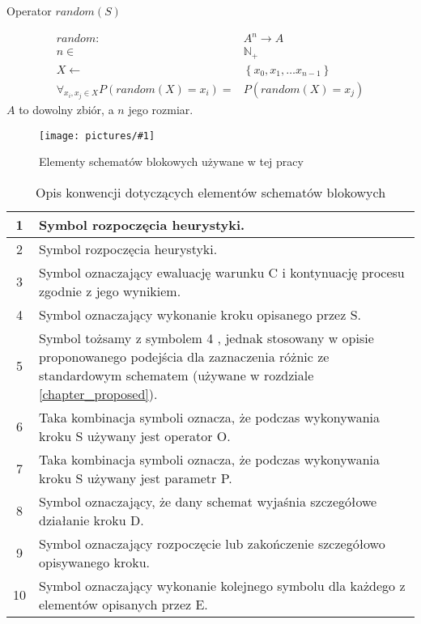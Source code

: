 \documentclass[twoside]{iisthesis}
\newcommand{\numberSet}{\mathbb}
\newcommand{\circled}[1]{ \textcircled{\scriptsize{#1}} }
\newcommand{\img}[1]{\texttt{[image: pictures/\#1]}}
\begin{document}
\begin{signature}
	\caption{Operator $random(S)$ \label{signature_random}}
	\begin{align}
	random: &A^n \rightarrow A \\
	n \in &\numberSet{N}_{+} \\
	X \gets &\left\{ x_0, x_1, \dots x_{n-1} \right\} \\
	\forall_{x_i, x_j \in X} P(random(X) = x_i) = &P(random(X) = x_j)
	\end{align}
	$A$ to dowolny zbiór, a $n$ jego rozmiar.
\end{signature}

\begin{figure}[H]
	\caption{Elementy schematów blokowych używane w tej pracy \label{figure_flowchart_conventions}}
	\img{conventions.png}
\end{figure}

\begin{table}[H]
	\caption{Opis konwencji dotyczących elementów schematów blokowych \label{table_flowchart_conventions}}
	\begin{tabularx}{\linewidth}{|c|X|}
		\hline 
		\circled{1} & Symbol rozpoczęcia heurystyki. \\
		\hline
		\circled{2} & Symbol rozpoczęcia heurystyki. \\
		\hline
		\circled{3} & Symbol oznaczający ewaluację warunku C i kontynuację procesu zgodnie z jego wynikiem. \\
		\hline
		\circled{4} & Symbol oznaczający wykonanie kroku opisanego przez S. \\
		\hline
		\circled{5} & Symbol tożsamy z symbolem \circled{4}, jednak stosowany w opisie proponowanego podejścia dla zaznaczenia różnic ze standardowym schematem (używane w rozdziale \ref{chapter_proposed}).\\
		\hline
		\circled{6} & Taka kombinacja symboli oznacza, że podczas wykonywania kroku S używany jest operator O. \\
		\hline
		\circled{7} & Taka kombinacja symboli oznacza, że podczas wykonywania kroku S używany jest parametr P. \\
		\hline
		\circled{8} & Symbol oznaczający, że dany schemat wyjaśnia szczegółowe działanie kroku D. \\
		\hline
		\circled{9} & Symbol oznaczający rozpoczęcie lub zakończenie szczegółowo opisywanego kroku. \\
		\hline
		\circled{10} & Symbol oznaczający wykonanie kolejnego symbolu dla każdego z elementów opisanych przez E. \\
		\hline
	\end{tabularx}
\end{table}
\end{document}
